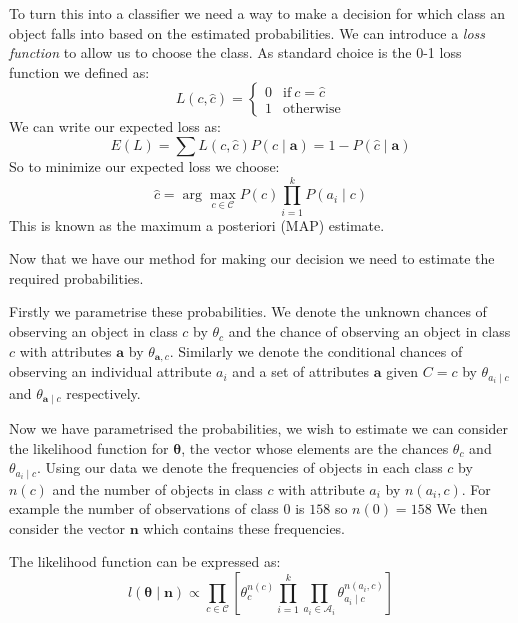 To turn this into a classifier we need a way to make a decision for which class an object falls into based on the estimated probabilities.
We can introduce a \textit{loss function} to allow us to choose the class.
As standard choice is the 0-1 loss function we defined as:
\begin{equation}
	L(c, \hat{c}) = 
	\begin{cases}
		0 & \text{if}\ c = \hat{c} \\
		1 & \text{otherwise}
	\end{cases}
\end{equation}
We can write our expected loss as:
\begin{equation}
	E(L) = \sum L(c, \hat{c})P(c \mid \mathbf{a}) = 1 - P(\hat{c} \mid \mathbf{a})
\end{equation}
So to minimize our expected loss we choose:
\begin{equation}
	\hat c = \arg\max_{c \in \mathcal{C}} P(c)\prod_{i=1}^{k}P(a_i \mid c)
\end{equation}
This is known as the maximum a posteriori (MAP) estimate.

Now that we have our method for making our decision we need to estimate the required probabilities.

Firstly we parametrise these probabilities.
We denote the unknown chances of observing an object in class $c$ by $\theta_c$ and the chance of observing an object in class $c$ with attributes $\mathbf{a}$ by $\theta_{\mathbf{a}, c}$.
Similarly we denote the conditional chances of observing an individual attribute $a_i$ and a set of attributes $\mathbf{a}$ given $C=c$ by $\theta_{a_i \mid c}$ and $\theta_{\mathbf{a} \mid c}$ respectively.

Now we have parametrised the probabilities, we wish to estimate we can consider the likelihood function for $\mathbf{\theta}$, the vector whose elements are the chances $\theta_{c}$ and $\theta_{a_i \mid c}$.
Using our data we denote the frequencies of objects in each class $c$ by $n(c)$ and the number of objects in class $c$ with attribute $a_i$ by $n(a_i, c)$.
For example the number of observations of class $0$ is $158$ so $n(0) = 158$
We then consider the vector $\mathbf{n}$ which contains these frequencies.

The likelihood function can be expressed as:
\begin{equation} \label{likelihood}
	l(\mathbf{\theta} \mid \mathbf{n}) \propto \prod_{c \in \mathcal{C}} \left[ \theta_c^{n(c)} \prod_{i=1}^k \prod_{a_i \in \mathcal{A}_i} \theta_{a_i \mid c}^{n(a_i, c)} \right]
\end{equation}


